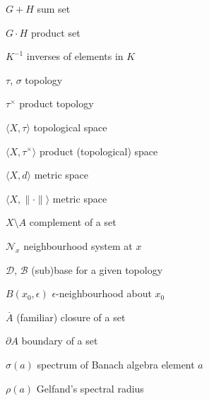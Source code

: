 \documentclass[12pt, oneside]{book}
\begin{document}
\begin{changemargin}{-2cm}{-2cm}

\noindent
\begin{minipage}[t]{0.6\textwidth}

$G+H$ \hfill sum set\

\medskip

$G \cdot H$ \hfill product set\

\medskip

$K^{-1}$ \hfill inverses of elements in $K$\

\medskip

$\tau$, $\sigma$ \hfill topology\

\medskip

$\tau^{\times}$ \hfill product topology\

\medskip

$\langle X, \tau \rangle$ \hfill topological space\

\medskip

$\langle X, \tau^{\times} \rangle$ \hfill product (topological) space\

\medskip

$\langle X, d \rangle$ \hfill metric space\

\medskip

$\langle X, \| \cdot \| \rangle$ \hfill metric space\

\medskip

$X \setminus A$ \hfill complement of a set\

\medskip

$\mathcal{N}_x$ \hfill neighbourhood system at $x$\

\medskip

$\mathscr{D}$, $\mathscr{B}$ \hfill (sub)base for a given topology\

\medskip

$B(x_0, \epsilon)$ \hfill $\epsilon$-neighbourhood about $x_0$\

\medskip

$\overline{A}$ \hfill (familiar) closure of a set\

\medskip

$\partial A$ \hfill boundary of a set\

\medskip

$\sigma(a)$ \hfill spectrum of Banach algebra element $a$\

\medskip

$\rho(a)$ \hfill Gelfand's spectral radius\

\medskip


\end{minipage}
\end{changemargin}
\end{document}
